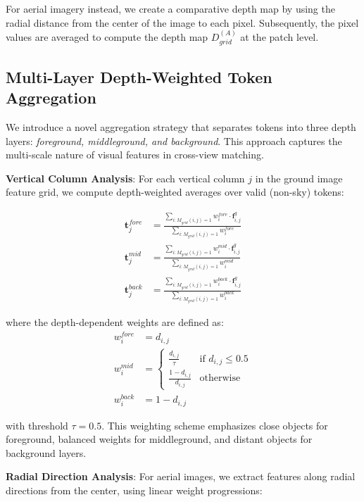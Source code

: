 \documentclass{bmvc2k}
\begin{document}
For aerial imagery instead, we create a comparative depth map by using the radial distance from the center of the image to each pixel. Subsequently, the pixel values are averaged to compute the depth map $D^{(A)}_{grid}$ at the patch level.

\subsection{Multi-Layer Depth-Weighted Token Aggregation}

We introduce a novel aggregation strategy that separates tokens into three depth layers: \textit{foreground, middleground, and background}. This approach captures the multi-scale nature of visual features in cross-view matching.

\textbf{Vertical Column Analysis}: For each vertical column $j$ in the ground image feature grid, we compute depth-weighted averages over valid (non-sky) tokens:

\begin{align}
\mathbf{t}_j^{fore} &= \frac{\sum_{i: M_{grid}(i,j)=1} w_i^{fore} \cdot \mathbf{f}_{i,j}^g}{\sum_{i: M_{grid}(i,j)=1} w_i^{fore}} \\
\mathbf{t}_j^{mid} &= \frac{\sum_{i: M_{grid}(i,j)=1} w_i^{mid} \cdot \mathbf{f}_{i,j}^g}{\sum_{i: M_{grid}(i,j)=1} w_i^{mid}} \\
\mathbf{t}_j^{back} &= \frac{\sum_{i: M_{grid}(i,j)=1} w_i^{back} \cdot \mathbf{f}_{i,j}^g}{\sum_{i: M_{grid}(i,j)=1} w_i^{back}}
\end{align}

where the depth-dependent weights are defined as:
\begin{align}
w_i^{fore} &= d_{i,j} \\
w_i^{mid} &= \begin{cases} 
\frac{d_{i,j}}{\tau} & \text{if } d_{i,j} \leq 0.5 \\
\frac{1-d_{i,j}}{d_{i,j}} & \text{otherwise}
\end{cases} \\
w_i^{back} &= 1 - d_{i,j}
\end{align}

with threshold $\tau = 0.5$. This weighting scheme emphasizes close objects for foreground, balanced weights for middleground, and distant objects for background layers.

\textbf{Radial Direction Analysis}: For aerial images, we extract features along radial directions from the center, using linear weight progressions:
\end{document}
